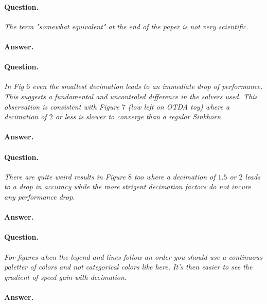 \documentclass[11pt]{article}
\begin{document}
\paragraph{Question.}

\emph{The term "somewhat equivalent" at the end of the paper is not very scientific.}

\paragraph{Answer.} 

\paragraph{Question.}

\emph{In Fig $6$ even the smallest decimation leads to an immediate drop of performance. This suggests a fundamental and uncontroled difference in the solvers used. This
observation is consistent with Figure $7$ (low left on OTDA toy) where a decimation of $2$ or less is slower to converge than a regular Sinkhorn.
}

\paragraph{Answer.} 

\paragraph{Question.}

\emph{There are quite weird results in Figure $8$ too where a decimation of $1.5$ or $2$ leads to a drop in accuracy while the more strigent decimation factors do not incure any performance drop.}

\paragraph{Answer.} 

\paragraph{Question.}

\emph{For figures when the legend and lines follow an order you should use
a continuous paletter of colors and not categorical colors like here. It's
then easier to see the gradient of speed gain with decimation.}

\paragraph{Answer.} 
\end{document}
